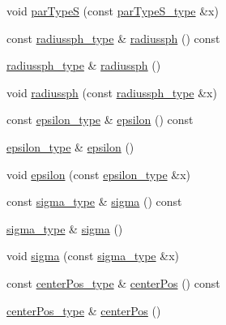 \begin{DoxyCompactItemize}
\item 
void \hyperlink{classsphere__t_a8765edb9b0dc648ed0b38859e60fde66}{par\-Type\-S} (const \hyperlink{classsphere__t_a750fe86f76f8c344ccb25e7dc73c2655}{par\-Type\-S\-\_\-type} \&x)
\item 
const \hyperlink{classsphere__t_a81d467c00ec72dc7b9907b521744696d}{radiussph\-\_\-type} \& \hyperlink{classsphere__t_a8f57ae37d54babd88f05b886178628f8}{radiussph} () const 
\item 
\hyperlink{classsphere__t_a81d467c00ec72dc7b9907b521744696d}{radiussph\-\_\-type} \& \hyperlink{classsphere__t_aa33faed17d4adafd437fd3715293feff}{radiussph} ()
\item 
void \hyperlink{classsphere__t_ac667ce6d45620cb4d91b3897406c6bd3}{radiussph} (const \hyperlink{classsphere__t_a81d467c00ec72dc7b9907b521744696d}{radiussph\-\_\-type} \&x)
\item 
const \hyperlink{classsphere__t_a9e61f3d5ab269b28a198f4b47519ac3f}{epsilon\-\_\-type} \& \hyperlink{classsphere__t_a0a1e28d5e9c18dacd8240d8464c34e3e}{epsilon} () const 
\item 
\hyperlink{classsphere__t_a9e61f3d5ab269b28a198f4b47519ac3f}{epsilon\-\_\-type} \& \hyperlink{classsphere__t_ad2e3248ad556064a4f1df72448d55844}{epsilon} ()
\item 
void \hyperlink{classsphere__t_ab15625125997f476a32ae6b52bb8a8b3}{epsilon} (const \hyperlink{classsphere__t_a9e61f3d5ab269b28a198f4b47519ac3f}{epsilon\-\_\-type} \&x)
\item 
const \hyperlink{classsphere__t_a20806454a1e5e7f7fb50b22a49aef704}{sigma\-\_\-type} \& \hyperlink{classsphere__t_a51e149a9cf8c45e5cb49745839ade1c0}{sigma} () const 
\item 
\hyperlink{classsphere__t_a20806454a1e5e7f7fb50b22a49aef704}{sigma\-\_\-type} \& \hyperlink{classsphere__t_ad4e40b95e0a4aab8c3b46f67d66b87d0}{sigma} ()
\item 
void \hyperlink{classsphere__t_ac417ed1e21f39cfa1674cc6cd1eb4154}{sigma} (const \hyperlink{classsphere__t_a20806454a1e5e7f7fb50b22a49aef704}{sigma\-\_\-type} \&x)
\item 
const \hyperlink{classsphere__t_a2786a8606da5d1dfbb50a237d6834daf}{center\-Pos\-\_\-type} \& \hyperlink{classsphere__t_a35cfedf2ff4ba6c05afd6bdea5637ef7}{center\-Pos} () const 
\item 
\hyperlink{classsphere__t_a2786a8606da5d1dfbb50a237d6834daf}{center\-Pos\-\_\-type} \& \hyperlink{classsphere__t_a507022c73db22f7b6b40e72d981876db}{center\-Pos} ()
\item 

\end{DoxyCompactItemize}
